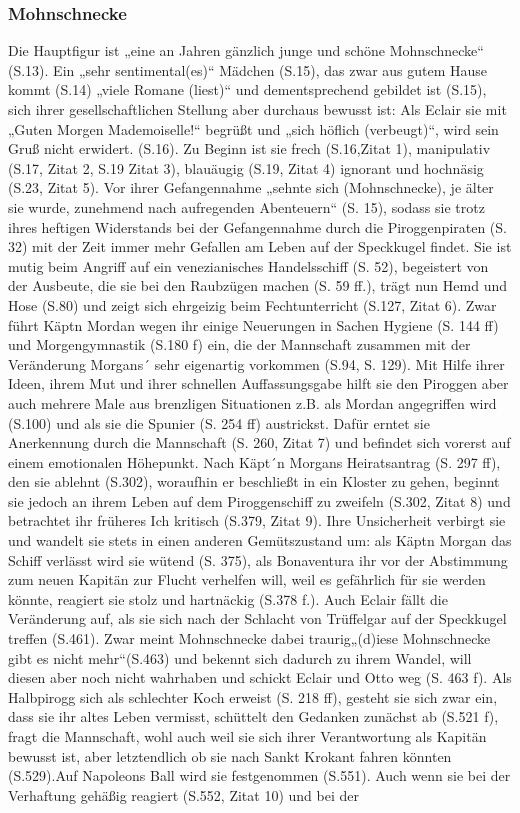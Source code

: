 \subsubsection{Mohnschnecke}

Die Hauptfigur ist „eine an Jahren gänzlich junge und schöne Mohnschnecke“ (S.13). Ein „sehr sentimental(es)“ Mädchen (S.15), das  zwar aus gutem Hause kommt (S.14) „viele Romane (liest)“ und dementsprechend gebildet ist  (S.15), sich ihrer gesellschaftlichen Stellung aber durchaus bewusst ist: Als Eclair sie mit „Guten Morgen Mademoiselle!“ begrüßt und „sich höflich (verbeugt)“, wird sein Gruß nicht erwidert. (S.16). Zu Beginn ist sie frech (S.16,Zitat 1), manipulativ (S.17, Zitat 2, S.19 Zitat 3), blauäugig (S.19, Zitat 4) ignorant und hochnäsig (S.23, Zitat 5). Vor ihrer Gefangennahme „sehnte sich (Mohnschnecke), je älter sie wurde, zunehmend nach aufregenden Abenteuern“ (S. 15), sodass sie trotz ihres heftigen Widerstands bei der Gefangennahme durch die Piroggenpiraten (S. 32) mit der Zeit immer mehr Gefallen am Leben auf der Speckkugel findet. Sie ist mutig beim Angriff auf ein venezianisches Handelsschiff (S. 52),  begeistert von der Ausbeute, die sie bei den Raubzügen machen (S. 59 ff.), trägt nun Hemd und Hose (S.80) und zeigt sich ehrgeizig beim Fechtunterricht (S.127, Zitat 6). Zwar führt Käptn Mordan wegen ihr einige Neuerungen in Sachen Hygiene (S. 144 ff) und Morgengymnastik (S.180 f) ein, die der Mannschaft  zusammen mit der Veränderung Morgans´ sehr eigenartig vorkommen (S.94, S. 129). Mit Hilfe ihrer Ideen, ihrem Mut und ihrer schnellen Auffassungsgabe  hilft sie den Piroggen aber auch mehrere Male aus brenzligen Situationen z.B. als Mordan angegriffen wird (S.100) und als sie die Spunier (S. 254 ff) austrickst. Dafür erntet sie Anerkennung durch die Mannschaft (S. 260, Zitat 7) und befindet sich vorerst auf einem emotionalen Höhepunkt.  Nach  Käpt´n Morgans Heiratsantrag (S. 297 ff), den sie ablehnt (S.302), woraufhin er beschließt in ein Kloster zu gehen, beginnt sie jedoch an ihrem Leben auf dem Piroggenschiff zu zweifeln (S.302, Zitat 8) und betrachtet ihr früheres Ich kritisch (S.379, Zitat 9). Ihre Unsicherheit verbirgt sie und  wandelt sie stets in einen anderen Gemütszustand um: als Käptn Morgan das Schiff verlässt wird sie wütend (S. 375), als Bonaventura ihr vor der Abstimmung zum neuen Kapitän zur Flucht verhelfen will, weil es gefährlich für sie werden könnte, reagiert sie stolz und hartnäckig (S.378 f.). Auch Eclair fällt die Veränderung auf, als sie sich nach der Schlacht von Trüffelgar auf der Speckkugel treffen (S.461). Zwar meint Mohnschnecke dabei traurig„(d)iese Mohnschnecke gibt es nicht mehr“(S.463) und bekennt sich dadurch zu ihrem Wandel, will diesen aber noch nicht wahrhaben und schickt Eclair und Otto weg (S. 463 f). Als Halbpirogg sich als schlechter Koch erweist (S. 218 ff), gesteht sie sich zwar ein, dass sie ihr altes Leben vermisst, schüttelt den Gedanken zunächst ab (S.521 f), fragt die Mannschaft, wohl auch weil sie sich ihrer Verantwortung als Kapitän bewusst ist, aber letztendlich ob sie nach Sankt Krokant fahren könnten (S.529).Auf Napoleons Ball wird sie festgenommen (S.551). Auch wenn sie bei der Verhaftung gehäßig reagiert (S.552, Zitat 10) und bei der 